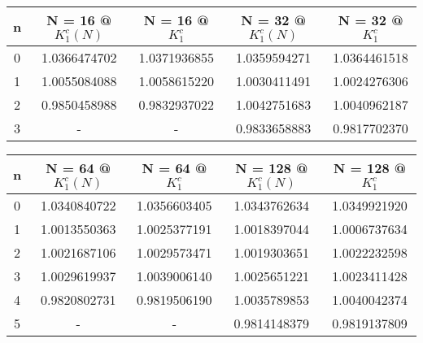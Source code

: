\documentclass[12pt]{article}
\begin{document}
\newpage  

\begin{center}
\begin{tabular}{|c|c|c|c|c|}
\hline
n & N = 16 @ $K_1^c(N)$ & N = 16 @ $K_1^c$ & N = 32 @ $K_1^c(N)$ & N = 32 @ $K_1^c$\\
\hline
0 & 1.0366474702 & 1.0371936855 & 1.0359594271 & 1.0364461518\\
1 & 1.0055084088 & 1.0058615220 & 1.0030411491& 1.0024276306\\
2 & 0.9850458988 & 0.9832937022  & 1.0042751683  & 1.0040962187\\
3 & - & -  & 0.9833658883  & 0.9817702370\\
\hline
\end{tabular}
\end{center}

\newpage  

\begin{center}
\begin{tabular}{|c|c|c|c|c|}
\hline
n & N = 64 @ $K_1^c(N)$ & N = 64 @ $K_1^c$ & N = 128 @ $K_1^c(N)$ & N = 128 @ $K_1^c$\\
\hline
0 & 1.0340840722& 1.0356603405 & 1.0343762634 & 1.0349921920\\
1 & 1.0013550363 & 1.0025377191 & 1.0018397044& 1.0006737634\\
2 & 1.0021687106 & 1.0029573471  & 1.0019303651  & 1.0022232598\\
3 & 1.0029619937 & 1.0039006140  & 1.0025651221  & 1.0023411428\\
4 & 0.9820802731 & 0.9819506190  & 1.0035789853  & 1.0040042374\\
5 & - & -  & 0.9814148379  & 0.9819137809   \\
\hline
\end{tabular}
\end{center}
\end{document}
